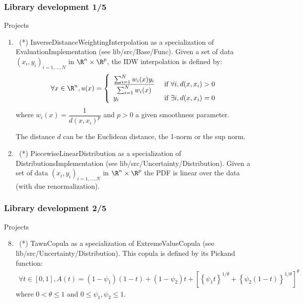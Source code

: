 \documentclass[8pt]{beamer}
\begin{document}
\begin{frame}
  \frametitle{Library development 1/5}
  \begin{block}{Projects}
    \begin{enumerate}
    \item~(*) \alert{\ttfamily InverseDistanceWeightingInterpolation} as a specialization of \alert{\ttfamily EvaluationImplementation} (see {\ttfamily lib/src/Base/Func}). Given a set of data $(x_i, y_i)_{i=1,\dots,N}$ in $\R^n\times\R^p$, the IDW interpolation is defined by:
      \begin{align}
        \forall x\in\R^n, u(x)=\left\{\begin{array}{ll}
                                        \dfrac{\sum_{i=1}^Nw_i(x)y_i}{\sum_{i=1}^Nw_i(x)} & \mbox{ if } \forall i, d(x, x_i) > 0\\
                                        y_i & \mbox{ if } \exists i, d(x, x_i)=0
                                      \end{array}
                                              \right.
      \end{align}
      where $w_i(x)=\dfrac{1}{d(x, x_i)^p}$ and $p>0$ a given smoothness parameter.

      The distance $d$ can be the Euclidean distance, the 1-norm or the sup norm.
      \item~(*) \alert{\ttfamily PiecewiseLinearDistribution} as a specialization of \alert{\ttfamily DistributionsImplementation} (see {\ttfamily lib/src/Uncertainty/Distribution}). Given a set of data $(x_i, y_i)_{i=1,\dots,N}$ in $\R^n\times\R^p$
      the PDF is linear over the data (with due renormalization).
    \end{enumerate}
  \end{block}
\end{frame}

\begin{frame}
  \frametitle{Library development 2/5}
  \begin{block}{Projects}
    \begin{enumerate}
      \setcounter{enumi}{7}
    \item~(*) \alert{\ttfamily TawnCopula} as a specialization of {\ttfamily ExtremeValueCopula} (see {\ttfamily lib/src/Uncertainty/Distribution}). This copula is defined by its Pickand function:
      \begin{align}
        \forall t\in[0,1], A(t)=(1-\psi_1)(1-t)+(1-\psi_2)t+\left[\left\{\psi_1t\right\}^{1/\theta}+\left\{\psi_2(1-t)\right\}^{1/\theta}\right]^\theta
      \end{align}
      where $0<\theta\leq 1$ and $0\leq\psi_1,\psi_2\leq 1$.
    \end{enumerate}
  \end{block}
\end{frame}
\end{document}
